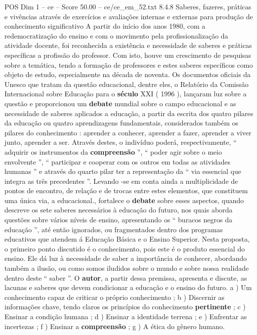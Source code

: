 \begin{textsample}{POS Dim 1 – ce – Score 50.00 – ce/ce\_em\_52.txt}  \label{ex:f1_pos_049}
8.4.8 Saberes, fazeres, práticas e vivências através de exercícios e avaliações internas e externas para produção de conhecimento significativo A partir do início dos anos 1980, com a redemocratização do ensino e com o movimento pela profissionalização da atividade docente, foi reconhecida a existência e necessidade de saberes e práticas específicas a profissão do professor.
Com isto, houve um crescimento de pesquisas sobre a temática, tendo a formação de professores e estes saberes específicos como objeto de estudo, especialmente na década de noventa.
Os documentos oficiais da Unesco que tratam da questão educacional, dentre eles, o Relatório da Comissão Internacional sobre Educação para o \textbf{século} XXI ( 1996 ), lançaram luz sobre a questão e proporcionou um \textbf{debate} mundial sobre o campo educacional e as necessidade de saberes aplicados a educação, a partir da escrita dos quatro pilares da educação ou quatro aprendizagens fundamentais, considerados também os pilares do conhecimento : aprender a conhecer, aprender a fazer, aprender a viver junto, aprender a ser.
Através destes, o indivíduo poderá, respectivamente, “ adquirir os instrumentos da \textbf{compreensão} ”, “ poder agir sobre o meio envolvente ”, “ participar e cooperar com os outros em todas as atividades humanas ” e através do quarto pilar ter a representação da “ via essencial que integra as três precedentes ”.
Levando -se em conta ainda a multiplicidade de pontos de encontro, de relação e de trocas entre estes elementos, que constituem uma única via, a educacional., fortalece o \textbf{debate} sobre esses aspectos, quando descreve os sete saberes necessários à educação do futuro, nos quais aborda questões sobre vários níveis de ensino, apresentando os “ buracos negros da educação ”, até então ignorados, ou fragmentados dentro dos programas educativos que atendem á Educação Básica e o Ensino Superior.
Nesta proposta, o primeiro ponto discutido é o conhecimento, pois este é o produto essencial do ensino.
Ele dá luz à necessidade de saber a importância de conhecer, abordando também a ilusão, ou como somos iludidos sobre o mundo e sobre nossa realidade dentro deste “ saber ”.
O \textbf{autor}, a partir dessa premissa, apresenta e discute, as lacunas e saberes que devem condicionar a educação e o ensino do futuro. a ) Um conhecimento capaz de criticar o próprio conhecimento ; b ) Discernir as informações chave, tendo claros os princípios do conhecimento \textbf{pertinente} ; c ) Ensinar a condição humana ; d ) Ensinar a identidade terrena ; e ) Enfrentar as incertezas ; f ) Ensinar a \textbf{compreensão} ; g ) A ética do gênero humano.

\end{textsample}

